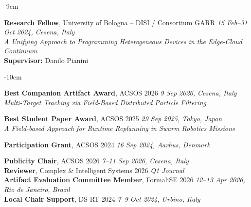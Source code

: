 \documentclass[10pt,a4paper]{altacv}
\begin{document}

    \begin{adjustwidth}{}{-9cm}
        \small

        \textcolor{accent}{\textbf{Research Fellow}}, University of Bologna -- DISI / Consortium GARR
        \hfill \textit{15 Feb--31 Oct 2024, Cesena, Italy}\\
        \emph{A Unifying Approach to Programming Heterogeneous Devices
        in the Edge-Cloud Continuum}\\
        \textbf{Supervisor:} Danilo Pianini

        \normalsize
    \end{adjustwidth}



    \begin{adjustwidth}{}{-10cm}
    \small


    \textcolor{accent}{\textbf{Best Companion Artifact Award}}, ACSOS 2026
    \hfill \textit{9 Sep 2026, Cesena, Italy}\\
    \emph{Multi-Target Tracking via Field-Based Distributed Particle Filtering}

    \par\smallskip

    \textcolor{accent}{\textbf{Best Student Paper Award}}, ACSOS 2025
    \hfill \textit{29 Sep 2025, Tokyo, Japan}\\
    \emph{A Field-based Approach for Runtime Replanning in Swarm Robotics Missions}

    \par\smallskip

    \textcolor{accent}{\textbf{Participation Grant}}, ACSOS 2024
    \hfill \textit{16 Sep 2024, Aarhus, Denmark}

    \divider


    \textcolor{accent}{\textbf{Publicity Chair}}, ACSOS 2026
    \hfill \textit{7--11 Sep 2026, Cesena, Italy}\\
    \textcolor{accent}{\textbf{Reviewer}}, Complex \& Intelligent Systems 2026
    \hfill \textit{Q1 Journal}\\
    \textcolor{accent}{\textbf{Artifact Evaluation Committee Member}}, FormaliSE 2026
    \hfill \textit{12--13 Apr 2026, Rio de Janeiro, Brazil}\\
    \textcolor{accent}{\textbf{Local Chair Support}}, DS-RT 2024
    \hfill \textit{7--9 Oct 2024, Urbino, Italy}


\end{adjustwidth}
\end{document}
